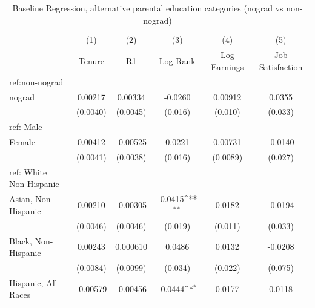 \begin{table}[htbp]\centering
\def\sym#1{\ifmmode^{#1}\else\(^{#1}\)\fi}
\caption{Baseline Regression, alternative parental education categories (nograd vs non-nograd)}
\begin{tabular}{l*{5}{c}}
\hline\hline
  &\multicolumn{1}{c}{(1)}&\multicolumn{1}{c}{(2)}&\multicolumn{1}{c}{(3)}&\multicolumn{1}{c}{(4)}&\multicolumn{1}{c}{(5)}\\
  &\multicolumn{1}{c}{Tenure}&\multicolumn{1}{c}{R1}&\multicolumn{1}{c}{Log Rank}&\multicolumn{1}{c}{Log Earnings}&\multicolumn{1}{c}{Job Satisfaction}\\
\hline
ref:non-nograd&                     &                     &                     &                     &                     \\
[1em]
nograd&     0.00217         &     0.00334         &     -0.0260         &     0.00912         &      0.0355         \\
  &    (0.0040)         &    (0.0045)         &     (0.016)         &     (0.010)         &     (0.033)         \\
[1em]
ref: Male&                     &                     &                     &                     &                     \\
[1em]
Female&     0.00412         &    -0.00525         &      0.0221         &     0.00731         &     -0.0140         \\
  &    (0.0041)         &    (0.0038)         &     (0.016)         &    (0.0089)         &     (0.027)         \\
[1em]
ref: White Non-Hispanic&                     &                     &                     &                     &                     \\
[1em]
Asian, Non-Hispanic&     0.00210         &    -0.00305         &     -0.0415\sym{**} &      0.0182         &     -0.0194         \\
  &    (0.0046)         &    (0.0046)         &     (0.019)         &     (0.011)         &     (0.033)         \\
[1em]
Black, Non-Hispanic&     0.00243         &    0.000610         &      0.0486         &      0.0132         &     -0.0208         \\
  &    (0.0084)         &    (0.0099)         &     (0.034)         &     (0.022)         &     (0.075)         \\
[1em]
Hispanic, All Races&    -0.00579         &    -0.00456         &     -0.0444\sym{*}  &      0.0177         &      0.0118         \\

\end{tabular}
\end{table}
